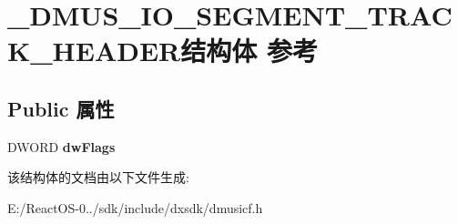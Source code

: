 \hypertarget{struct___d_m_u_s___i_o___s_e_g_m_e_n_t___t_r_a_c_k___h_e_a_d_e_r}{}\section{\+\_\+\+D\+M\+U\+S\+\_\+\+I\+O\+\_\+\+S\+E\+G\+M\+E\+N\+T\+\_\+\+T\+R\+A\+C\+K\+\_\+\+H\+E\+A\+D\+E\+R结构体 参考}
\label{struct___d_m_u_s___i_o___s_e_g_m_e_n_t___t_r_a_c_k___h_e_a_d_e_r}
\subsection*{Public 属性}
\begin{DoxyCompactItemize}
\item 
\mbox{\label{struct___d_m_u_s___i_o___s_e_g_m_e_n_t___t_r_a_c_k___h_e_a_d_e_r_a2f075afeec6f960a061e6ad8e27225cc}} 
D\+W\+O\+RD {\bfseries dw\+Flags}
\end{DoxyCompactItemize}


该结构体的文档由以下文件生成\+:\begin{DoxyCompactItemize}
\item 
E\+:/\+React\+O\+S-\/0../sdk/include/dxsdk/dmusicf.\+h\end{DoxyCompactItemize}
